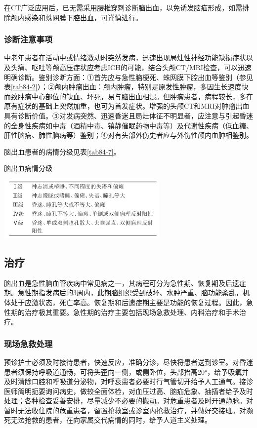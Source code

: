 在CT广泛应用后，已无需采用腰椎穿刺诊断脑出血，以免诱发脑疝形成，如需排除颅内感染和蛛网膜下腔出血，可谨慎进行。

\subsubsection{诊断注意事项}

中老年患者在活动中或情绪激动时突然发病，迅速出现局灶性神经功能缺损症状以及头痛、呕吐等颅高压症状应考虑ICH的可能，结合头颅CT/MRI检查，可以迅速明确诊断。鉴别诊断方面：①首先应与急性脑梗死、蛛网膜下腔出血等鉴别（参见表\ref{tab84-2}）；②颅内肿瘤出血：颅内肿瘤，特别是原发性肿瘤，多因生长速度快而致肿瘤中心部位的缺血、坏死，易与脑出血相混。但肿瘤患者，病程较长，多在原有症状的基础上突然加重，也可为首发症状。增强的头颅CT和MRI对肿瘤出血具有诊断价值。③对发病突然、迅速昏迷且局灶体征不明显者，应注意与引起昏迷的全身性疾病如中毒（酒精中毒、镇静催眠药物中毒等）及代谢性疾病（低血糖、肝性脑病、肺性脑病等）鉴别；④对有头部外伤史者应与外伤性颅内血肿相鉴别。

脑出血患者的病情分级见表\ref{tab84-7}。

\begin{table}[htbp]
\centering
\caption{脑出血病情分级}
\label{tab84-7}
\includegraphics[width=3.27083in,height=1.22917in]{./images/Image00383.jpg}
\end{table}

\subsection{治疗}

脑出血是急性脑血管疾病中常见病之一，其病程可分为急性期、恢复期及后遗症期。急性期指发病后的3周内，此期脑组织受到破坏、水肿严重、脑功能紊乱，机体处于应激状态，死亡率高。恢复期和后遗症期主要是功能的恢复过程。因此，急性期的治疗极其重要。急性期的治疗主要包括现场急救处理、内科治疗和手术治疗。

\subsubsection{现场急救处理}

预诊护士必须及时接待患者，快速反应，准确分诊，尽快将患者送到诊室。对昏迷患者须保持呼吸道通畅，可将头歪向一侧，或侧卧位，头部抬高20°，给予吸氧并及时清除口腔和呼吸道分泌物，对呼衰患者必要时行气管切开给予人工通气。接诊医师简明扼要询问病史，做较全面体检，对血压过高、脑疝危象、抽搐者给予及时处理；各种检查妥善安排，尽量减少不必要的搬动。对危重患者及时开通静脉。对暂时无法收住院的危重患者，留置抢救室或诊室内抢救治疗，并做好交接班。对濒死无法抢救的患者，在向家属交代病情的同时，给予人道主义处理。

